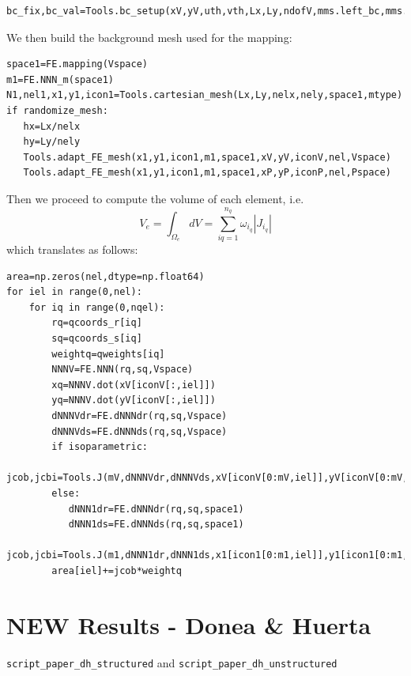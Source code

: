 \begin{lstlisting}
bc_fix,bc_val=Tools.bc_setup(xV,yV,uth,vth,Lx,Ly,ndofV,mms.left_bc,mms.right_bc,mms.bottom_bc,mms.top_bc)
\end{lstlisting}

We then build the background mesh used for the mapping:
\begin{lstlisting}
space1=FE.mapping(Vspace)
m1=FE.NNN_m(space1)
N1,nel1,x1,y1,icon1=Tools.cartesian_mesh(Lx,Ly,nelx,nely,space1,mtype)
if randomize_mesh:
   hx=Lx/nelx
   hy=Ly/nely
   Tools.adapt_FE_mesh(x1,y1,icon1,m1,space1,xV,yV,iconV,nel,Vspace)
   Tools.adapt_FE_mesh(x1,y1,icon1,m1,space1,xP,yP,iconP,nel,Pspace)
\end{lstlisting}




Then we proceed to compute the volume of each element, i.e. 
\[
V_e = \int_{\Omega_e} dV = \sum_{iq=1}^{n_q} \omega_{i_q} |J_{i_q}|
\]
which translates as follows: 
\begin{lstlisting}
area=np.zeros(nel,dtype=np.float64) 
for iel in range(0,nel):
    for iq in range(0,nqel):
        rq=qcoords_r[iq]
        sq=qcoords_s[iq]
        weightq=qweights[iq]
        NNNV=FE.NNN(rq,sq,Vspace)
        xq=NNNV.dot(xV[iconV[:,iel]]) 
        yq=NNNV.dot(yV[iconV[:,iel]]) 
        dNNNVdr=FE.dNNNdr(rq,sq,Vspace)
        dNNNVds=FE.dNNNds(rq,sq,Vspace)
        if isoparametric:
           jcob,jcbi=Tools.J(mV,dNNNVdr,dNNNVds,xV[iconV[0:mV,iel]],yV[iconV[0:mV,iel]])
        else:
           dNNN1dr=FE.dNNNdr(rq,sq,space1)
           dNNN1ds=FE.dNNNds(rq,sq,space1)
           jcob,jcbi=Tools.J(m1,dNNN1dr,dNNN1ds,x1[icon1[0:m1,iel]],y1[icon1[0:m1,iel]])
        area[iel]+=jcob*weightq
\end{lstlisting}



\newpage
\section*{NEW Results - Donea \& Huerta}

{\tt script\_paper\_dh\_structured} and {\tt script\_paper\_dh\_unstructured}


